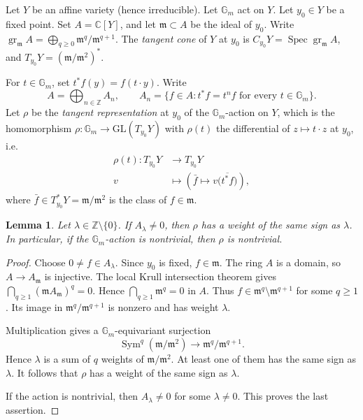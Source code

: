 \documentclass[10pt,a4paper]{amsart}
\newtheorem{lemma}[theorem]{Lemma}
\DeclareMathOperator{\Spec}{Spec}
\DeclareMathOperator{\Sym}{Sym}
\DeclareMathOperator{\gr}{gr}
\newcommand{\C}{\mathbb C}
\newcommand{\Gm}{\mathbb G_m}
\newcommand{\GL}{\mathrm{GL}}
\begin{document}
Let $Y$ be an affine variety (hence irreducible). Let $\Gm$ act on $Y$. Let $y_0\in Y$ be a fixed point. Set $A=\C[Y]$, and let $\mathfrak m\subset A$ be the ideal of $y_0$. Write $\gr_{\mathfrak m}A=\bigoplus_{q\ge0}\mathfrak m^q/\mathfrak m^{q+1}$. The \emph{tangent cone} of $Y$ at $y_0$ is $C_{y_0}Y=\Spec\gr_{\mathfrak m}A$, and $T_{y_0}Y=(\mathfrak m/\mathfrak m^2)^*$.

For $t\in\Gm$, set $t^*f(y)=f(t\cdot y)$. Write
\[
    A=\bigoplus_{n\in\mathbb Z}A_n,
    \qquad
    A_n=\{f\in A:t^*f=t^nf\text{ for every }t\in\Gm\}.
\]
Let $\rho$ be the \emph{tangent representation} at $y_0$ of the $\Gm$-action on $Y$, which is the homomorphism
$\rho:\Gm \longrightarrow \GL(T_{y_0}Y)$ with $\rho(t)$ the differential of $z\mapsto t\cdot z$ at $y_0$, i.e.
    \[
        \begin{aligned}
            \rho(t):T_{y_0}Y& \longrightarrow T_{y_0}Y\\
            v &\longmapsto
            \left(\bar f\mapsto v\bigl(\overline{t^*f}\bigr)\right),
        \end{aligned}
    \]
    where $\bar f\in T_{y_0}^*Y=\mathfrak m/\mathfrak m^2$ is the class of $f\in\mathfrak m$. 



\begin{lemma}\label{weightsigns}
    Let $\lambda\in\mathbb Z\setminus\{0\}$. If $A_\lambda\ne0$, then $\rho$ has a weight of the same sign as $\lambda$. In particular, if the $\Gm$-action is nontrivial, then $\rho$ is nontrivial.
\end{lemma}
\begin{proof}
    Choose $0\ne f\in A_\lambda$. Since $y_0$ is fixed, $f\in\mathfrak m$.
    The ring $A$ is a domain, so $A\to A_{\mathfrak m}$ is injective. The local Krull intersection theorem gives $\bigcap_{q\ge1}(\mathfrak mA_{\mathfrak m})^q=0$.
    Hence $\bigcap_{q\ge1}\mathfrak m^q=0$ in $A$. Thus $f\in\mathfrak m^q\setminus\mathfrak m^{q+1}$ for some $q\ge1$. Its image in $\mathfrak m^q/\mathfrak m^{q+1}$ is nonzero and has weight $\lambda$.

    Multiplication gives a $\Gm$-equivariant surjection
    \[
        \Sym^q(\mathfrak m/\mathfrak m^2)
        \longrightarrow
        \mathfrak m^q/\mathfrak m^{q+1}.
    \]
    Hence $\lambda$ is a sum of $q$ weights of $\mathfrak m/\mathfrak m^2$. At least one of them has the same sign as $\lambda$. It follows that $\rho$ has a weight of the same sign as $\lambda$.

    If the action is nontrivial, then $A_\lambda\ne0$ for some $\lambda\ne0$. This proves the last assertion.
\end{proof}
\end{document}
